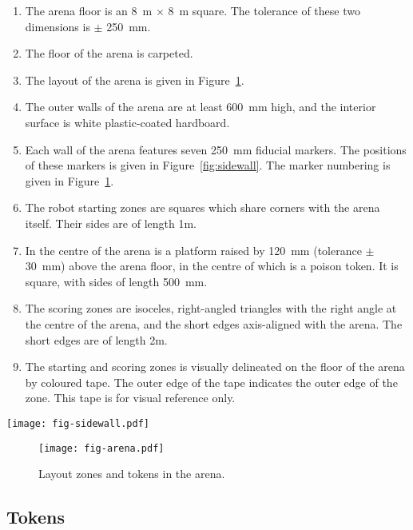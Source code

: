 \begin{enumerate}
  \item The arena floor is an \SI{8}{m} $\times$ \SI{8}{m} square. The tolerance
        of these two dimensions is $\pm$ \SI{250}{mm}.
  \item The floor of the arena is carpeted.
  \item The layout of the arena is given in Figure~\ref{fig:arena}.
  \item The outer walls of the arena are at least \SI{600}{mm} high, and the
        interior surface is white plastic-coated hardboard.
  \item Each wall of the arena features seven \SI{250}{mm} fiducial markers.
        The positions of these markers is given in Figure~\ref{fig:sidewall}.
        The marker numbering is given in Figure~\ref{fig:arena}.
  \item The robot starting zones are squares which share corners with the arena
        itself. Their sides are of length \si{1}{m}.
  \item In the centre of the arena is a platform raised by \SI{120}{mm}
        (tolerance $\pm$ \SI{30}{mm}) above the arena floor, in the centre of
        which is a poison token. It is square, with sides of length \SI{500}{mm}.
  \item The scoring zones are isoceles, right-angled triangles with the right
        angle at the centre of the arena, and the short edges axis-aligned with
        the arena. The short edges are of length \si{2}{m}.
  \item The starting and scoring zones is visually delineated on the floor of
        the arena by coloured tape. The outer edge of the tape indicates the
        outer edge of the zone. This tape is for visual reference only.
\end{enumerate}

\begin{sidewaysfigure}
  \texttt{[image: fig-sidewall.pdf]}
  \caption{Layout of markers along each arena wall.}
  \label{fig:sidewall}
\end{sidewaysfigure}

\begin{figure}
  \texttt{[image: fig-arena.pdf]}
  \caption{Layout zones and tokens in the arena.}
  \label{fig:arena}
\end{figure}

\subsection{Tokens}
\label{spec:tokens}

